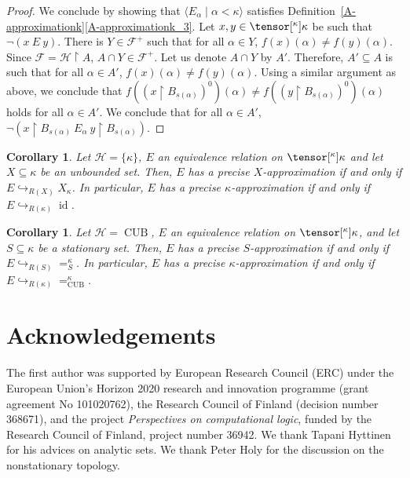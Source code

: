 \documentclass{amsart}
\numberwithin{equation}{section}
\newcommand{\pre}[2]{\tensor[^{#1}]{#2}{}}
\newcommand{\1}{\mathbf{I}}
\newcommand{\2}{\mathbf{II}}
\renewcommand{\k}{\kappa}
\newcommand{\id}{\operatorname{id}}
\DeclareMathOperator{\CUB}{CUB}
\newtheorem{corollary}[theorem]{Corollary}
\theoremstyle{definition}
\theoremstyle{remark}
\begin{document}
\begin{proof}
We conclude by showing that $\langle E_\alpha\mid \alpha<\kappa\rangle$ satisfies Definition~\ref{A-approximationk}\ref{A-approximationk_3}. Let $x,y\in\pre{\k}{\kappa}$ be such that $\neg(x\ E\ y)$. There is $Y\in \mathcal{F}^+$ such that for all $\alpha\in Y$, $f(x)(\alpha)\neq f(y)(\alpha)$. Since $\mathcal{F}=\mathcal{H}\restriction A$, $A\cap Y\in \mathcal{F}^+$. Let us denote $A\cap Y$ by $A'$. Therefore, $A'\subseteq A$ is such that for all $\alpha\in A'$, $f(x)(\alpha)\neq f(y)(\alpha)$. Using a similar argument as above, we conclude that $f((x\restriction B_{s(\alpha)})^0)(\alpha)\neq f((y\restriction B_{s(\alpha)})^0)(\alpha)$ holds for all $\alpha\in A'$. We conclude that for all $\alpha\in A'$, $\neg (x\restriction B_{s(\alpha)}\ E_\alpha\ y\restriction B_{s(\alpha)})$.
\end{proof}

\begin{corollary}
Let $\mathcal{H}=\{\k\}$, $E$ an equivalence relation on $\pre{\k}{\kappa}$ and let $X\subseteq \k$ be an unbounded set. Then, $E$ has a precise $X$-approximation if and only if $E\hookrightarrow_{R(X)} X_\k$. %
In particular, $E$ has a precise $\k$-approximation if and only if $E\hookrightarrow_{R(\k)} \id$.
\end{corollary}

\begin{corollary}
Let $\mathcal{H}=\CUB$, $E$ an equivalence relation on $\pre{\k}{\kappa}$, and  let $S\subseteq \k$ be a stationary set. Then, $E$ has a precise $S$-approximation if and only if $E\hookrightarrow_{R(S)}=_S^\k$. %
In particular, $E$ has a precise $\k$-approximation if and only if $E\hookrightarrow_{R(\k)} =^\k_{\CUB}$.
\end{corollary}




\section*{Acknowledgements}
The first author was supported by European Research Council (ERC) under the European Union's Horizon 2020 research and innovation programme (grant agreement No 101020762), the Research Council of Finland (decision number 368671), and the project \textit{Perspectives on computational logic}, funded by the Research Council of Finland, project number 36942.
We thank Tapani Hyttinen for his advices on analytic sets. We thank Peter Holy for the discussion on the nonstationary topology.
\end{document}
